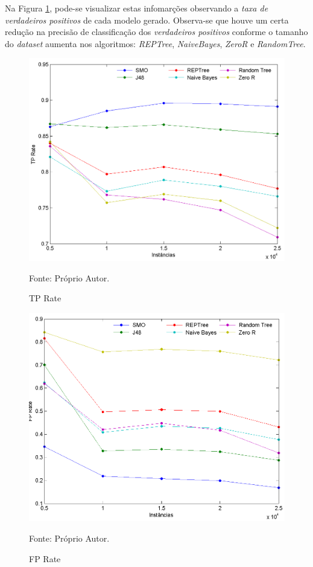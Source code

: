 \documentclass[
	12pt,				%
	openright,			%
	oneside,	
	a4paper,				%
	english,				%
	brazil				%
]{abntex2/abntex2} %
\begin{document}
Na Figura \ref{figtpRate}, pode-se visualizar estas infomarções observando a \textit{taxa de verdadeiros positivos} de cada modelo gerado. Observa-se que houve um certa redução na precisão de classificação dos \textit{verdadeiros positivos}  conforme o tamanho do \textit{dataset} aumenta  nos algoritmos: \textit{REPTree}, \textit{NaiveBayes}, \textit{ZeroR} e \textit{RandomTree}.

\begin{figure}[!htb]
	\caption{\label{figtpRate} TP Rate}
	\begin{center}
		\includegraphics[scale=0.8]{graphs/tp_graph.png}
	\end{center}
	Fonte: Próprio Autor.
\end{figure}

\begin{figure}[!htb]
	\caption{\label{figfpRate} FP Rate}
	\begin{center}
		\includegraphics[scale=0.8]{graphs/fp_graph.png}
	\end{center}
	Fonte: Próprio Autor.
\end{figure}
	
\end{document}

